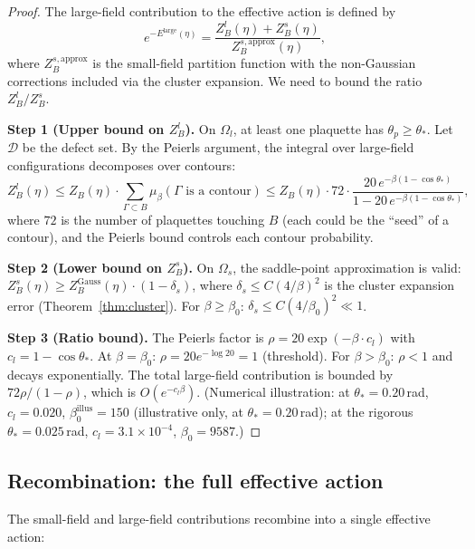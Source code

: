 \documentclass[11pt]{article}
\theoremstyle{definition}
\begin{document}
\begin{proof}
The large-field contribution to the effective action is defined by
\begin{equation}
e^{-E^{\mathrm{large}}(\eta)}
=\frac{Z_B^l(\eta)+Z_B^s(\eta)}{Z_B^{s,\mathrm{approx}}(\eta)},
\end{equation}
where $Z_B^{s,\mathrm{approx}}$ is the small-field partition function
with the non-Gaussian corrections included via the cluster expansion.
We need to bound the ratio $Z_B^l/Z_B^s$.

\textbf{Step 1 (Upper bound on $Z_B^l$).}
On $\Omega_l$, at least one plaquette has $\theta_p\ge\theta_*$.
Let $\mathcal{D}$ be the defect set.  By the Peierls argument, the
integral over large-field configurations decomposes over contours:
\begin{equation}
Z_B^l(\eta)\le Z_B(\eta)\cdot\sum_{\Gamma\subset B}
\mu_\beta(\Gamma\text{ is a contour})
\le Z_B(\eta)\cdot 72\cdot\frac{20\,e^{-\beta(1-\cos\theta_*)}}
{1-20\,e^{-\beta(1-\cos\theta_*)}},
\end{equation}
where $72$ is the number of plaquettes touching $B$ (each could
be the ``seed'' of a contour), and the Peierls bound controls each
contour probability.

\textbf{Step 2 (Lower bound on $Z_B^s$).}
On $\Omega_s$, the saddle-point approximation is valid:
$Z_B^s(\eta)\ge Z_B^{\mathrm{Gauss}}(\eta)\cdot(1-\delta_s)$,
where $\delta_s\le C(4/\beta)^2$ is the cluster expansion error
(Theorem~\ref{thm:cluster}).  For $\beta\ge\beta_0$:
$\delta_s\le C(4/\beta_0)^2\ll 1$.

\textbf{Step 3 (Ratio bound).}
The Peierls factor is
$\rho=20\exp(-\beta\cdot c_l)$ with $c_l=1-\cos\theta_*$.
At $\beta=\beta_0$: $\rho=20e^{-\log 20}=1$ (threshold).
For $\beta>\beta_0$: $\rho<1$ and decays exponentially.
The total large-field
contribution is bounded by $72\rho/(1-\rho)$, which is $O(e^{-c_l\beta})$.
(Numerical illustration: at $\theta_*=0.20$\,rad, $c_l=0.020$,
$\beta_0^{\mathrm{illus}}=150$ (illustrative only, at $\theta_*=0.20$\,rad); at the rigorous $\theta_*=0.025$\,rad,
$c_l=3.1\times 10^{-4}$, $\beta_0=9587$.)
\end{proof}

\subsection{Recombination: the full effective action}
\label{subsec:recombine}

The small-field and large-field contributions recombine into a single
effective action:
\end{document}
